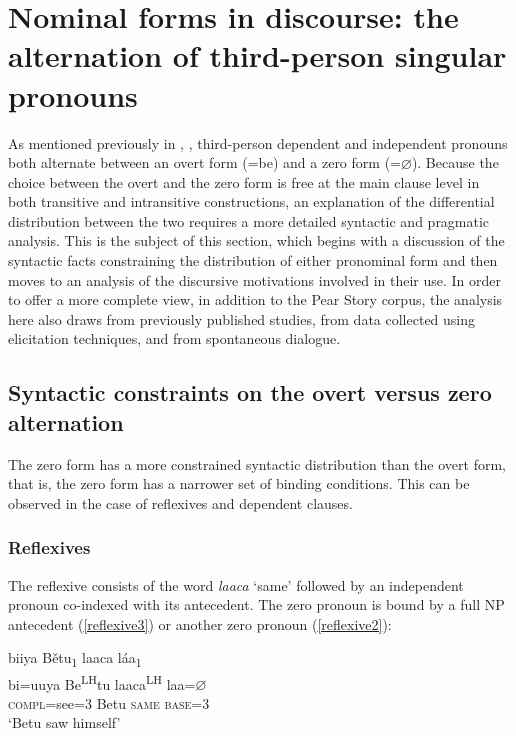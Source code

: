 
\chapter{Nominal forms in discourse: the alternation of third-person singular pronouns}\label{alternation}

As mentioned previously in , , third-person dependent and independent pronouns both alternate between an overt form (=be) and a zero form (=$\varnothing$). Because the choice between the overt and the zero form is free at the main clause level in both transitive and intransitive constructions, an explanation of the differential distribution between the two requires a more detailed syntactic and pragmatic analysis. This is the subject of this section, which begins with a discussion of the syntactic facts constraining the distribution of either pronominal form and then moves to an analysis of the discursive motivations involved in their use. In order to offer a more complete view, in addition to the Pear Story corpus, the analysis here also draws from previously published studies, from data collected using elicitation techniques, and from spontaneous dialogue. 


\section{Syntactic constraints on the overt versus zero alternation}

The zero form has a more constrained syntactic distribution than the overt form, that is, the zero form has a narrower set of binding conditions. This can be observed in the case of reflexives and dependent clauses. 


\subsection{Reflexives}

The reflexive consists of the word \textit{laaca} `same' followed by an independent pronoun co-indexed with its antecedent. The zero pronoun is bound by a full NP antecedent (\ref{reflexive3}) or another zero pronoun (\ref{reflexive2}): 

\ea\label{reflexive3}
\glll biiya B\v{e}tu\textsubscript{1} laaca l\'{a}a\textsubscript{1} \\
bi=uuya Be\textsuperscript{LH}tu laaca\textsuperscript{LH} laa={$\varnothing$} \\
\textsc{compl}=see=\textsc{3} Betu \textsc{same} \textsc{base}=\textsc{3} \\
\glt `Betu saw himself' 
\z

